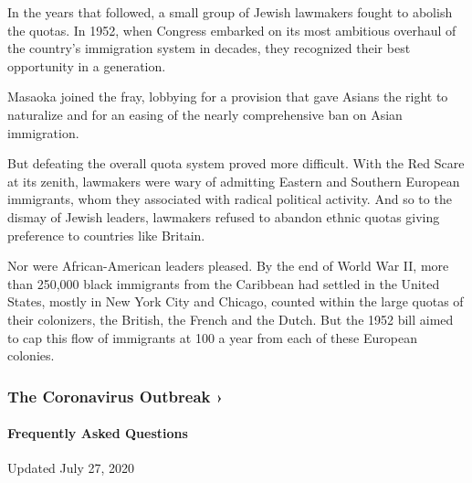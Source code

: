 In the years that followed, a small group of Jewish lawmakers fought to
abolish the quotas. In 1952, when Congress embarked on its most
ambitious overhaul of the country's immigration system in decades, they
recognized their best opportunity in a generation.

Masaoka joined the fray, lobbying for a provision that gave Asians the
right to naturalize and for an easing of the nearly comprehensive ban on
Asian immigration.

But defeating the overall quota system proved more difficult. With the
Red Scare at its zenith, lawmakers were wary of admitting Eastern and
Southern European immigrants, whom they associated with radical
political activity. And so to the dismay of Jewish leaders, lawmakers
refused to abandon ethnic quotas giving preference to countries like
Britain.

Nor were African-American leaders pleased. By the end of World War II,
more than 250,000 black immigrants from the Caribbean had settled in the
United States, mostly in New York City and Chicago, counted within the
large quotas of their colonizers, the British, the French and the Dutch.
But the 1952 bill aimed to cap this flow of immigrants at 100 a year
from each of these European colonies.

\href{https://www.nytimes.com/news-event/coronavirus?action=click\&pgtype=Article\&state=default\&region=MAIN_CONTENT_3\&context=storylines_faq}{}

\hypertarget{the-coronavirus-outbreak-}{%
\subsubsection{The Coronavirus Outbreak
›}\label{the-coronavirus-outbreak-}}

\hypertarget{frequently-asked-questions}{%
\paragraph{Frequently Asked
Questions}\label{frequently-asked-questions}}

Updated July 27, 2020

